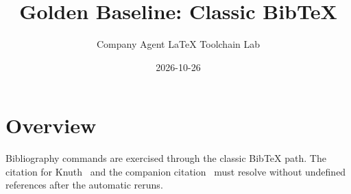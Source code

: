 \documentclass[11pt]{article}
\begin{document}
\title{Golden Baseline: Classic BibTeX}
\author{Company Agent LaTeX Toolchain Lab}
\date{2026-10-26}
\maketitle

\section{Overview}
Bibliography commands are exercised through the classic BibTeX path. The
citation for Knuth~\cite{knuth1984} and the companion
citation~\cite{lamport1994} must resolve without undefined references after
the automatic reruns.



\end{document}
